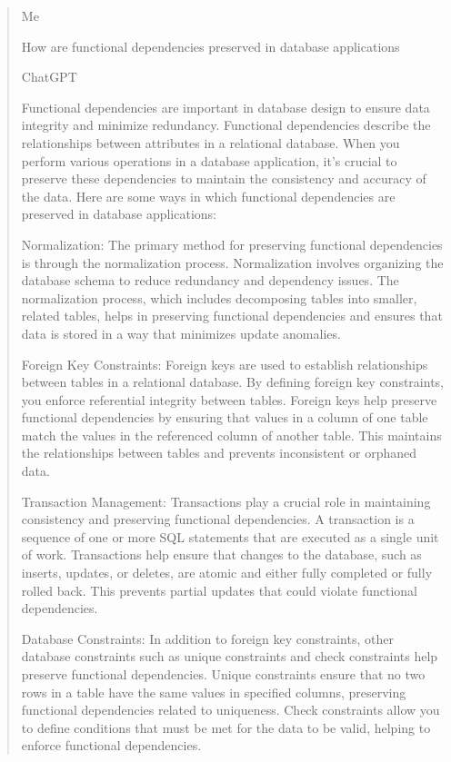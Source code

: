 \documentclass[11pt]{article}
\begin{document}
\begin{enumerate}
\begin{quotation}
Me

How are functional dependencies preserved in database applications

ChatGPT

Functional dependencies are important in database design to ensure data integrity and minimize redundancy. Functional dependencies describe the relationships between attributes in a relational database. When you perform various operations in a database application, it's crucial to preserve these dependencies to maintain the consistency and accuracy of the data. Here are some ways in which functional dependencies are preserved in database applications:

    Normalization:
        The primary method for preserving functional dependencies is through the normalization process. Normalization involves organizing the database schema to reduce redundancy and dependency issues.
        The normalization process, which includes decomposing tables into smaller, related tables, helps in preserving functional dependencies and ensures that data is stored in a way that minimizes update anomalies.

    Foreign Key Constraints:
        Foreign keys are used to establish relationships between tables in a relational database. By defining foreign key constraints, you enforce referential integrity between tables.
        Foreign keys help preserve functional dependencies by ensuring that values in a column of one table match the values in the referenced column of another table. This maintains the relationships between tables and prevents inconsistent or orphaned data.

    Transaction Management:
        Transactions play a crucial role in maintaining consistency and preserving functional dependencies. A transaction is a sequence of one or more SQL statements that are executed as a single unit of work.
        Transactions help ensure that changes to the database, such as inserts, updates, or deletes, are atomic and either fully completed or fully rolled back. This prevents partial updates that could violate functional dependencies.

    Database Constraints:
        In addition to foreign key constraints, other database constraints such as unique constraints and check constraints help preserve functional dependencies.
        Unique constraints ensure that no two rows in a table have the same values in specified columns, preserving functional dependencies related to uniqueness.
        Check constraints allow you to define conditions that must be met for the data to be valid, helping to enforce functional dependencies.


\end{quotation}
\end{enumerate}
\end{document}
